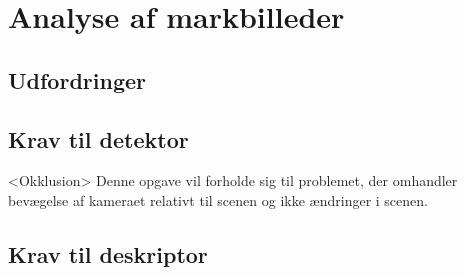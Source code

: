 \chapter{Analyse af markbilleder} \label{sec:mark}
\section{Udfordringer}
\section{Krav til detektor}
<Okklusion>
Denne opgave vil forholde sig til problemet, der omhandler bevægelse af kameraet relativt til scenen og ikke ændringer i scenen.
\section{Krav til deskriptor}